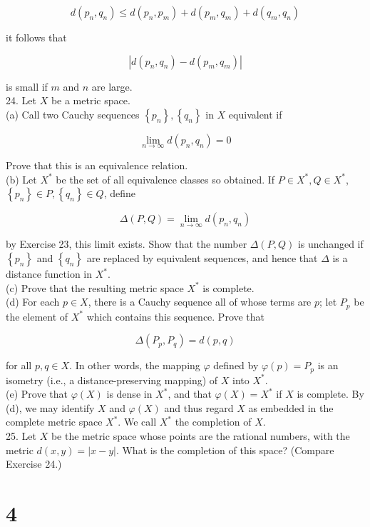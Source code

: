 \documentclass[10pt]{article}
\begin{document}
$$
d\left(p_{n}, q_{n}\right) \leq d\left(p_{n}, p_{m}\right)+d\left(p_{m}, q_{m}\right)+d\left(q_{m}, q_{n}\right)
$$

it follows that

$$
\left|d\left(p_{n}, q_{n}\right)-d\left(p_{m}, q_{m}\right)\right|
$$

is small if $m$ and $n$ are large.\\
24. Let $X$ be a metric space.\\
(a) Call two Cauchy sequences $\left\{p_{n}\right\},\left\{q_{n}\right\}$ in $X$ equivalent if

$$
\lim _{n \rightarrow \infty} d\left(p_{n}, q_{n}\right)=0
$$

Prove that this is an equivalence relation.\\
(b) Let $X^{*}$ be the set of all equivalence classes so obtained. If $P \in X^{*}, Q \in X^{*}$, $\left\{p_{n}\right\} \in P,\left\{q_{n}\right\} \in Q$, define

$$
\Delta(P, Q)=\lim _{n \rightarrow \infty} d\left(p_{n}, q_{n}\right)
$$

by Exercise 23, this limit exists. Show that the number $\Delta(P, Q)$ is unchanged if $\left\{p_{n}\right\}$ and $\left\{q_{n}\right\}$ are replaced by equivalent sequences, and hence that $\Delta$ is a distance function in $X^{*}$.\\
(c) Prove that the resulting metric space $X^{*}$ is complete.\\
(d) For each $p \in X$, there is a Cauchy sequence all of whose terms are $p$; let $P_{p}$ be the element of $X^{*}$ which contains this sequence. Prove that

$$
\Delta\left(P_{p}, P_{q}\right)=d(p, q)
$$

for all $p, q \in X$. In other words, the mapping $\varphi$ defined by $\varphi(p)=P_{p}$ is an isometry (i.e., a distance-preserving mapping) of $X$ into $X^{*}$.\\
(e) Prove that $\varphi(X)$ is dense in $X^{*}$, and that $\varphi(X)=X^{*}$ if $X$ is complete. By (d), we may identify $X$ and $\varphi(X)$ and thus regard $X$ as embedded in the complete metric space $X^{*}$. We call $X^{*}$ the completion of $X$.\\
25. Let $X$ be the metric space whose points are the rational numbers, with the metric $d(x, y)=|x-y|$. What is the completion of this space? (Compare Exercise 24.)

\section*{4}
\end{document}
